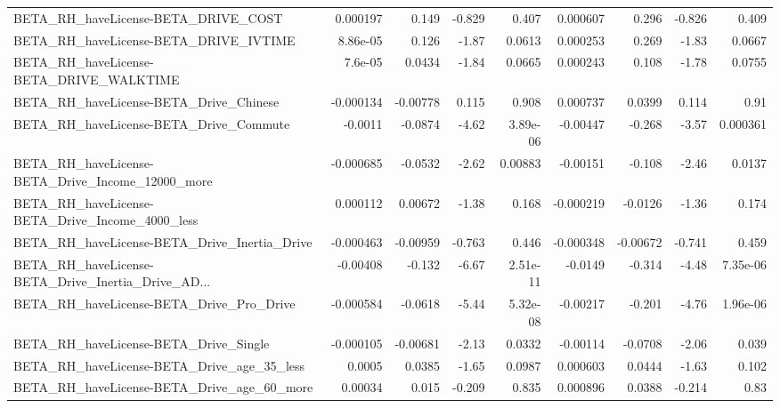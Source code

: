 \begin{tabular}{lrrrrrrrr}
BETA\_RH\_haveLicense-BETA\_DRIVE\_COST                &    0.000197 &        0.149 &   -0.829 &    0.407 &   0.000607 &       0.296 &       -0.826 &         0.409 \\
BETA\_RH\_haveLicense-BETA\_DRIVE\_IVTIME              &    8.86e-05 &        0.126 &    -1.87 &   0.0613 &   0.000253 &       0.269 &        -1.83 &        0.0667 \\
BETA\_RH\_haveLicense-BETA\_DRIVE\_WALKTIME            &     7.6e-05 &       0.0434 &    -1.84 &   0.0665 &   0.000243 &       0.108 &        -1.78 &        0.0755 \\
BETA\_RH\_haveLicense-BETA\_Drive\_Chinese             &   -0.000134 &     -0.00778 &    0.115 &    0.908 &   0.000737 &      0.0399 &        0.114 &          0.91 \\
BETA\_RH\_haveLicense-BETA\_Drive\_Commute             &     -0.0011 &      -0.0874 &    -4.62 & 3.89e-06 &   -0.00447 &      -0.268 &        -3.57 &      0.000361 \\
BETA\_RH\_haveLicense-BETA\_Drive\_Income\_12000\_more   &   -0.000685 &      -0.0532 &    -2.62 &  0.00883 &   -0.00151 &      -0.108 &        -2.46 &        0.0137 \\
BETA\_RH\_haveLicense-BETA\_Drive\_Income\_4000\_less    &    0.000112 &      0.00672 &    -1.38 &    0.168 &  -0.000219 &     -0.0126 &        -1.36 &         0.174 \\
BETA\_RH\_haveLicense-BETA\_Drive\_Inertia\_Drive       &   -0.000463 &     -0.00959 &   -0.763 &    0.446 &  -0.000348 &    -0.00672 &       -0.741 &         0.459 \\
BETA\_RH\_haveLicense-BETA\_Drive\_Inertia\_Drive\_AD... &    -0.00408 &       -0.132 &    -6.67 & 2.51e-11 &    -0.0149 &      -0.314 &        -4.48 &      7.35e-06 \\
BETA\_RH\_haveLicense-BETA\_Drive\_Pro\_Drive           &   -0.000584 &      -0.0618 &    -5.44 & 5.32e-08 &   -0.00217 &      -0.201 &        -4.76 &      1.96e-06 \\
BETA\_RH\_haveLicense-BETA\_Drive\_Single              &   -0.000105 &     -0.00681 &    -2.13 &   0.0332 &   -0.00114 &     -0.0708 &        -2.06 &         0.039 \\
BETA\_RH\_haveLicense-BETA\_Drive\_age\_35\_less         &      0.0005 &       0.0385 &    -1.65 &   0.0987 &   0.000603 &      0.0444 &        -1.63 &         0.102 \\
BETA\_RH\_haveLicense-BETA\_Drive\_age\_60\_more         &     0.00034 &        0.015 &   -0.209 &    0.835 &   0.000896 &      0.0388 &       -0.214 &          0.83 \\

\end{tabular}
